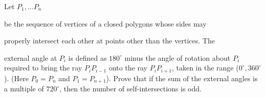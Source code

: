 Let $ P_{1}, \ldots P_{n}$

 be the sequence of vertices of a closed polygons whose sides may 

properly intersect each other at points other than the vertices. The 

external angle at $ P_{i}$ is defined as $ 180^\circ$ minus the angle of rotation about $ P_{i}$ required to bring the ray $ P_{i}P_{i-1}$ onto the ray $ P_{i}P_{i+1}$, taken in the range ($ 0^\circ, 360^\circ$). (Here $ P_{0}=P_{n}$ and $ P_{1}=P_{n+1}$). Prove that if the sum of the external angles is a multiple of $ 720^\circ$, then the number of self-intersections is odd.